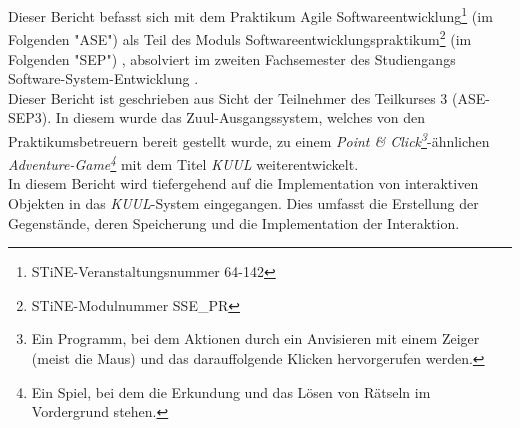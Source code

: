 \documentclass[12pt,twoside]{article}
\theoremstyle{plain}
\theoremstyle{definition}
\theoremstyle{remark}
\begin{document}
Dieser Bericht befasst sich mit dem Praktikum Agile Softwareentwicklung\footnote{STiNE-Veranstaltungsnummer 64-142} (im Folgenden \string"ASE")
 als Teil des Moduls Softwareentwicklungspraktikum\footnote{STiNE-Modulnummer SSE\_PR} (im Folgenden \string"SEP")
 , absolviert im zweiten Fachsemester %
des Studiengangs Software-System-Entwicklung %
.\\
Dieser Bericht ist geschrieben aus Sicht der Teilnehmer des Teilkurses 3 (ASE-SEP3).
In diesem wurde das Zuul-Ausgangssystem, welches von den Praktikumsbetreuern bereit gestellt wurde, zu einem \textit{Point \& Click\footnote{Ein Programm, bei dem Aktionen durch ein Anvisieren mit einem Zeiger (meist die Maus) und das darauffolgende Klicken hervorgerufen werden.}}-ähnlichen \textit{Adventure-Game\footnote{Ein Spiel, bei dem die Erkundung und das Lösen von Rätseln im Vordergrund stehen.}} mit dem Titel \textit{KUUL} weiterentwickelt.\\
In diesem Bericht wird tiefergehend auf die Implementation von interaktiven Objekten in das \textit{KUUL}-System eingegangen.
Dies umfasst die Erstellung der Gegenstände, deren Speicherung und die Implementation der Interaktion.

%
\end{document}
